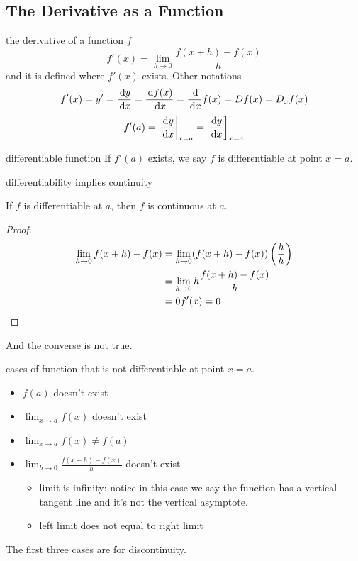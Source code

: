 \documentclass[Calculus 1 Recitation.tex]{subfiles}
\begin{document}
\subsection{The Derivative as a Function}

\begin{myleftlinebox}
	the derivative of a function $f$
	\tcblower
	\[f'(x)=\lim_{h\to 0}\frac{f(x+h)-f(x)}{h}\]
	and it is defined where $f'(x)$ exists. Other notations
	\[f'(x)=y'=\frac{\,\mathrm{d} y}{\,\mathrm{d} x}=\frac{\,\mathrm{d} f(x)}{\,\mathrm{d} x}=\frac{\,\mathrm{d} }{\,\mathrm{d} x} f(x)=Df(x)=D_x f(x)\]
	\[f'(a)=\left.\frac{\,\mathrm{d} y}{\,\mathrm{d} x}\right|_{x=a}=\left.\frac{\,\mathrm{d} y}{\,\mathrm{d} x}\right]_{x=a}\]
\end{myleftlinebox}

\begin{myleftlinebox}
	differentiable function
	\tcblower
	If $f'(a)$ exists, we say $f$ is differentiable at point $x=a$.
\end{myleftlinebox}

\begin{myleftlinebox}
	differentiability implies continuity
	\tcblower
	\begin{theorem}\label{thm:diffToContin}
		If $f$ is differentiable at $a$, then $f$ is continuous at $a$.
	\end{theorem}
	\begin{proof}
		\begin{equation*}
			\begin{split}
				\lim_{h\to 0}f(x+h)-f(x)&=\lim_{h\to 0} (f(x+h)-f(x))\left( \frac{h}{h} \right)\\
				&= \lim_{h\to 0}h \frac{f(x+h)-f(x)}{h}\\
				&= 0f'(x)=0
			\end{split}
		\end{equation*}
	\end{proof}
	And the converse is not true.
\end{myleftlinebox}

\begin{myleftlinebox}
	cases of function that is not differentiable at point $x=a$.
	\tcblower
	\begin{itemize}
		\item $f(a)$ doesn't exist
		\item $\lim_{x\to a}f(x)$ doesn't exist
		\item $\lim_{x\to a}f(x)\neq f(a)$ 
		\item $\lim_{h\to 0} \frac{f(x+h)-f(x)}{h}$ doesn't exist\begin{itemize}
			\item limit is infinity: notice in this case we say the function has a vertical tangent line and it's not the vertical asymptote.
			\item left limit does not equal to right limit
		\end{itemize}
	\end{itemize}
	The first three cases are for discontinuity.
\end{myleftlinebox}
\end{document}
